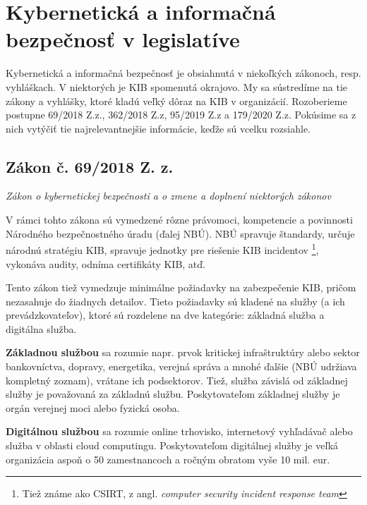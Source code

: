 \chapter{Kybernetická a informačná bezpečnosť v legislatíve}
Kybernetická a informačná bezpečnosť je obsiahnutá v niekoľkých zákonoch, resp. vyhláškach. V niektorých je KIB 
spomenutá okrajovo. My sa sústredíme na tie zákony a vyhlášky, ktoré kladú veľký dôraz na KIB v organizácií. 
Rozoberieme postupne 69/2018 Z.z.\cite{69/2018}, 362/2018 Z.z\cite{362/2018}, 95/2019 Z.z\cite{95/2019} a 
179/2020 Z.z\cite{179/2020}. Pokúsime sa z nich vytýčiť tie najrelevantnejšie informácie, keďže sú vcelku rozsiahle.

\newcommand\lawsubtitle[1]{\begin{flushleft}\small\textit{#1}\end{flushleft}}

\section{Zákon č. 69/2018 Z. z.}
\lawsubtitle{Zákon o kybernetickej bezpečnosti a o zmene a doplnení niektorých zákonov \cite{69/2018}}

V rámci tohto zákona sú vymedzené rôzne právomoci, kompetencie a povinnosti Národného bezpečnostného úradu (ďalej NBÚ).
NBÚ spravuje štandardy, určuje národnú stratégiu KIB, spravuje jednotky pre riešenie KIB incidentov \footnote{ Tiež
známe ako CSIRT, z angl. \textit{computer security incident response team} }, vykonáva audity, odníma certifikáty KIB, atď.

Tento zákon tiež vymedzuje minimálne požiadavky na zabezpečenie KIB, pričom nezasahuje do žiadnych detailov. 
Tieto požiadavky sú kladené na služby (a ich prevádzkovateľov), ktoré sú rozdelene na dve kategórie: 
základná služba a digitálna služba.

\textbf{Základnou službou} sa rozumie napr. prvok kritickej infraštruktúry alebo sektor bankovníctva, dopravy, 
energetika, verejná správa a mnohé ďalšie (NBÚ udržiava kompletný zoznam), vrátane ich podsektorov. Tiež, služba 
závislá od základnej služby je považovaná za základnú službu. Poskytovateľom základnej služby je orgán verejnej 
moci alebo fyzická osoba.

\textbf{Digitálnou službou} sa rozumie online trhovisko, internetový vyhľadávač alebo služba v oblasti cloud computingu. 
Poskytovateľom digitálnej služby je veľká organizácia aspoň o 50 zamestnancoch a ročným obratom vyše 10 mil. eur.

